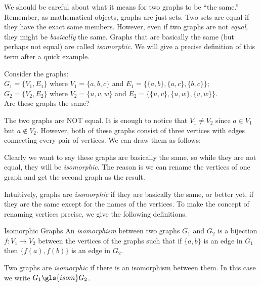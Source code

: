\documentclass[12pt]{article}
\begin{document}
We should be careful about what it means for two graphs to be ``the same.''  Remember, as mathematical objects, graphs are just sets.  Two sets are equal if they have the exact same members.  However, even if two graphs are not \emph{equal}, they might be \emph{basically} the same.  Graphs that are basically the same (but perhaps not equal) are called \emph{isomorphic}.  We will give a precise definition of this term after a quick example.

\begin{example}
Consider the graphs:\\ $G_1 = \{V_1, E_1\}$ where $V_1 = \{a, b, c\}$ and $E_1 = \{\{a,b\}, \{a,c\}, \{b,c\}\}$; \\$G_2 = \{V_2, E_2\}$ where $V_2 = \{u,v,w\}$ and $E_2 = \{\{u,v\}, \{u,w\}, \{v,w\}\}$. \\ 
Are these graphs the same?

\begin{solution}
The two graphs are NOT equal.  It is enough to notice that $V_1 \ne V_2$ since $a \in V_1$ but $a \notin V_2$.  However, both of these graphs consist of three vertices with edges connecting every pair of vertices.  We can draw them as follows:

\begin{center}
\qquad
{}
\end{center}
Clearly we want to say these graphs are basically the same, so while they are not equal, they will be \emph{isomorphic}.  The reason is we can rename the vertices of one graph and get the second graph as the result.
\end{solution}
\end{example}

Intuitively, graphs are \emph{isomorphic} if they are basically the same, or better yet, if they are the same except for the names of the vertices.  To make the concept of renaming vertices precise, we give the following definitions.

\begin{defbox}{Isomorphic Graphs}
An \emph{isomorphism} between two graphs $G_1$ and $G_2$ is a bijection $f:V_1 \to V_2$ between the vertices of the graphs such that if $\{a,b\}$ is an edge in $G_1$ then $\{f(a), f(b)\}$ is an edge in $G_2$.

Two graphs are \emph{isomorphic} if there is an isomorphism between them.  In this case we write $G_1 \gls{isom} G_2$.
\end{defbox}
\end{document}
